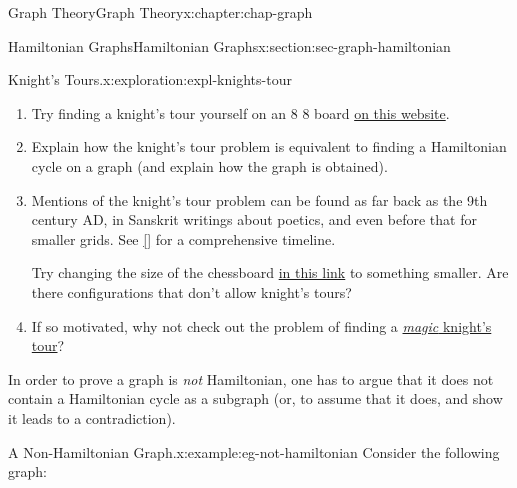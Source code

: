 \documentclass[oneside,10pt,]{book}
\newcommand{\xreffont}{\relax}
\numberwithin{equation}{section}
\begin{document}
\begin{chapterptx}{Graph Theory}{}{Graph Theory}{}{}{x:chapter:chap-graph}
\begin{sectionptx}{Hamiltonian Graphs}{}{Hamiltonian Graphs}{}{}{x:section:sec-graph-hamiltonian}
\begin{exploration}{Knight's Tours.}{x:exploration:expl-knights-tour}
\begin{sidebyside}{1}{0.275}{0.275}{0}
\begin{sbspanel}{0.45}
\end{sbspanel}%
\end{sidebyside}%
\begin{enumerate}[font=\bfseries,label=(\alph*),ref=\alph*]
\item{}Try finding a knight's tour yourself on an 8 \texttimes{} 8 board \href{http://www.maths-resources.com/knights/}{on this website}.%
\item{}Explain how the knight's tour problem is equivalent to finding a Hamiltonian cycle on a graph (and explain how the graph is obtained).%
\item{}Mentions of the knight's tour problem can be found as far back as the 9th century AD, in Sanskrit writings about poetics, and even before that for smaller grids. See \hyperlink{x:biblio:bib-jelliss-2019}{[{\xreffont 4}]} for a comprehensive timeline.%
\par
Try changing the size of the chessboard \href{http://www.maths-resources.com/knights/}{in this link} to something smaller. Are there configurations that don't allow knight's tours?%
\item{}If so motivated, why not check out the problem of finding a \href{http://www.mayhematics.com/t/1d.htm}{\emph{magic} knight's tour}?%
\end{enumerate}
\end{exploration}%
In order to prove a graph is \emph{not} Hamiltonian, one has to argue that it does not contain a Hamiltonian cycle as a subgraph (or, to assume that it does, and show it leads to a contradiction).%
\begin{example}{A Non-Hamiltonian Graph.}{x:example:eg-not-hamiltonian}%
Consider the following graph:%
\begin{sidebyside}{1}{0.375}{0.375}{0}%
\begin{sbspanel}{0.25}%
\end{sbspanel}
\end{sidebyside}
\end{example}
\end{sectionptx}
\end{chapterptx}
\end{document}
